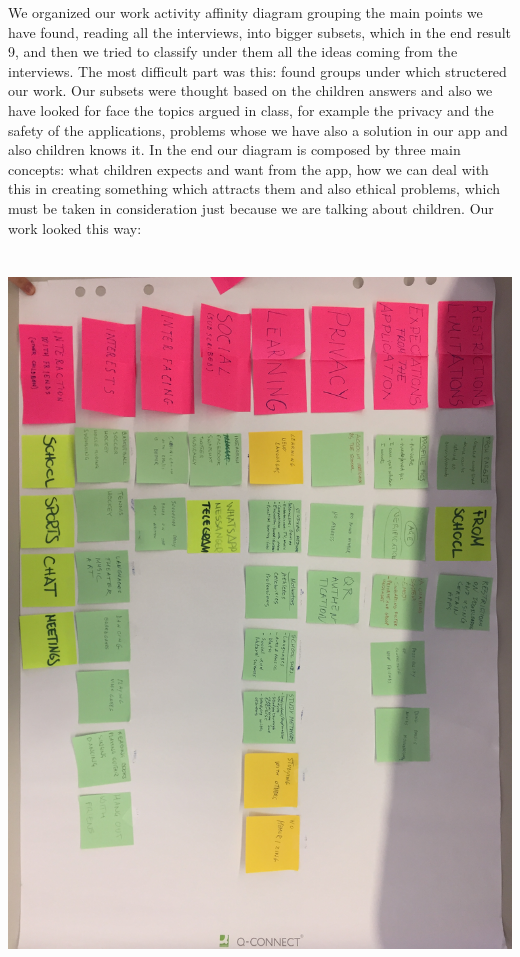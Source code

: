\documentclass[12pt]{report}
\begin{document}
	We organized our work activity affinity diagram grouping the main points
	we have found, reading all the interviews, into bigger subsets, which in the
	end result 9, and then we tried to classify under them all the ideas coming
	from the interviews. The most difficult part was this: found groups under
	which structered our work. Our subsets were thought based on the children
	answers and also we have looked for face the topics argued in class, for
	example the privacy and the safety of the applications, problems whose we
	have also a solution in our app and also children knows it. In the end our diagram
	is composed by three main concepts: what children expects and want from the app,
	how we can deal with this in creating something which attracts them and also ethical
	problems, which must be taken in consideration just because we are talking about
	children. Our work looked this way: \\\\\\
	\includegraphics[width = 1.0\linewidth]{affinity_diagram.jpg}\break
\end{document}
